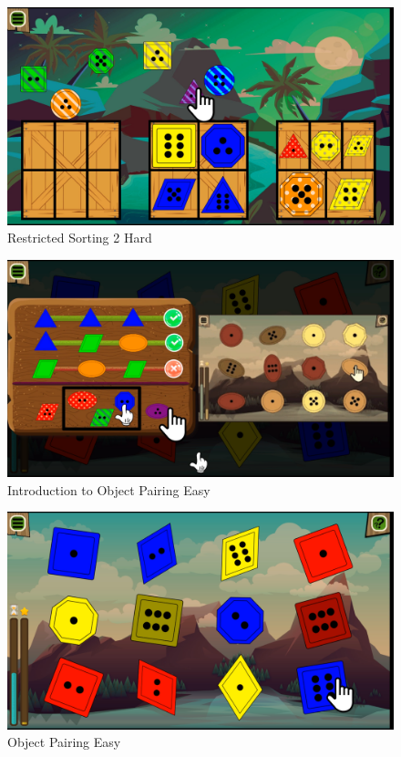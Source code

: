 \begin{figure}[H]
    \centering
    \includegraphics[width=1\textwidth]{figures/restricted2}
    \caption{Restricted Sorting 2 Hard}
    \label{fig:restricted2}
\end{figure}

\begin{figure}[H]
    \centering
    \includegraphics[width=1\textwidth]{figures/introgame}
    \caption{Introduction to Object Pairing Easy}
    \label{fig:introgame}
\end{figure}

\begin{figure}[H]
    \centering
    \includegraphics[width=1\textwidth]{figures/gameasy}
    \caption{Object Pairing Easy}
    \label{fig:gameeasy}
\end{figure}

